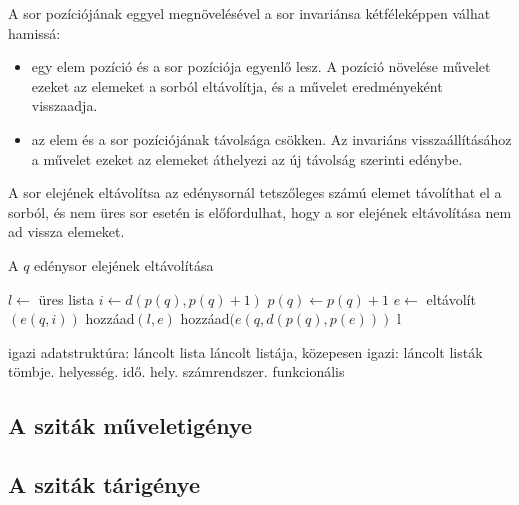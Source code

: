 A sor pozíciójának eggyel megnövelésével a sor invariánsa kétféleképpen válhat hamissá:
\begin{itemize}
\item egy elem pozíció és a sor pozíciója egyenlő lesz. A pozíció növelése művelet ezeket az elemeket a sorból eltávolítja, és a művelet eredményeként visszaadja.
\item az elem és a sor pozíciójának távolsága csökken. Az invariáns visszaállításához a művelet ezeket az elemeket áthelyezi az új távolság szerinti edénybe.
\end{itemize}
A sor elejének eltávolítsa az edénysornál tetszőleges számú elemet távolíthat el a sorból, és nem üres sor esetén is előfordulhat, hogy a sor elejének eltávolítása nem ad vissza elemeket.

\begin{algorithm}
\caption{A $q$ edénysor elejének eltávolítása}
\label{alg:buckets-remove-min}
\begin{algorithmic}[1]
	\State $l \gets$ üres lista
	\State $i \gets d(p(q), p(q)+1)$
	\State $p(q) \gets p(q)+1$
		\State $e \gets$ eltávolít$(e(q, i))$
			\State hozzáad$(l, e)$
		\Else
			\State hozzáad$(e(q, d(p(q), p(e)))$
		\EndIf
	\EndWhile
	\State \Return l
\EndFunction
\end{algorithmic}
\end{algorithm}

{\color{red}igazi adatstruktúra: láncolt lista láncolt listája, közepesen igazi: láncolt listák tömbje. helyesség. idő. hely. számrendszer. funkcionális}

\subsection{A sziták műveletigénye}

\subsection{A sziták tárigénye}


